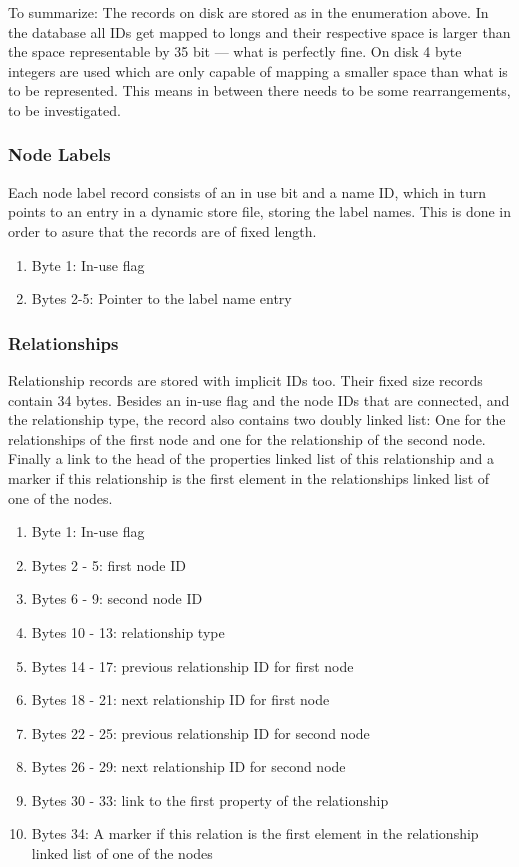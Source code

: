 \documentclass[a4paper,10pt]{article}
\begin{document}
    To summarize: The records on disk are stored as in the enumeration above. In the database all IDs get mapped to longs and their respective space is larger than the space representable by 35 bit --- what is perfectly fine.
    On disk 4 byte integers are used which are only capable of mapping a smaller space than what is to be represented. This means in between there needs to be some rearrangements, to be investigated.
    
    \subsubsection{Node Labels}
    Each node label record consists of an in use bit and a name ID, which in turn points to an entry in a dynamic store file, storing the label names. This is done in order to asure that the records are of fixed length.
    \begin{enumerate}
     \item Byte 1: In-use flag
     \item Bytes 2-5: Pointer to the label name entry
    \end{enumerate}

    

    \subsubsection{Relationships}
    Relationship records are stored with implicit IDs too. Their fixed size records contain 34 bytes. Besides an in-use flag and the node IDs that are connected, and the relationship type, the record also contains two doubly linked list: One for the relationships of the first node and one for the relationship of the second node. Finally a link to the head of the properties linked list of this relationship and a marker if this relationship is the first element in the relationships linked list of one of the nodes.
    \begin{enumerate}
     \item Byte 1: In-use flag 
     \item Bytes 2 - 5: first node ID 
     \item Bytes 6 - 9: second node ID 
     \item Bytes 10 - 13: relationship type 
     \item Bytes 14 - 17: previous relationship ID for first node
     \item Bytes 18 - 21: next relationship ID for first node
     \item Bytes 22 - 25: previous relationship ID for second node
     \item Bytes 26 - 29: next relationship ID for second node
     \item Bytes 30 - 33: link to the first property of the relationship
     \item Bytes 34: A marker if this relation is the first element in the relationship linked list of one of the nodes
    \end{enumerate}
\end{document}
